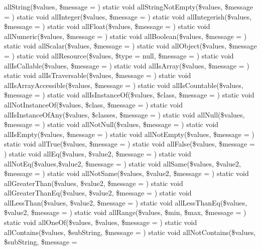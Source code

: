 all\+String(\$values, \$message = \textquotesingle{}\textquotesingle{})  static void all\+String\+Not\+Empty(\$values, \$message = \textquotesingle{}\textquotesingle{})  static void all\+Integer(\$values, \$message = \textquotesingle{}\textquotesingle{})  static void all\+Integerish(\$values, \$message = \textquotesingle{}\textquotesingle{})  static void all\+Float(\$values, \$message = \textquotesingle{}\textquotesingle{})  static void all\+Numeric(\$values, \$message = \textquotesingle{}\textquotesingle{})  static void all\+Boolean(\$values, \$message = \textquotesingle{}\textquotesingle{})  static void all\+Scalar(\$values, \$message = \textquotesingle{}\textquotesingle{})  static void all\+Object(\$values, \$message = \textquotesingle{}\textquotesingle{})  static void all\+Resource(\$values, \$type = null, \$message = \textquotesingle{}\textquotesingle{})  static void all\+Is\+Callable(\$values, \$message = \textquotesingle{}\textquotesingle{})  static void all\+Is\+Array(\$values, \$message = \textquotesingle{}\textquotesingle{})  static void all\+Is\+Traversable(\$values, \$message = \textquotesingle{}\textquotesingle{})  static void all\+Is\+Array\+Accessible(\$values, \$message = \textquotesingle{}\textquotesingle{})  static void all\+Is\+Countable(\$values, \$message = \textquotesingle{}\textquotesingle{})  static void all\+Is\+Instance\+Of(\$values, \$class, \$message = \textquotesingle{}\textquotesingle{})  static void all\+Not\+Instance\+Of(\$values, \$class, \$message = \textquotesingle{}\textquotesingle{})  static void all\+Is\+Instance\+Of\+Any(\$values, \$classes, \$message = \textquotesingle{}\textquotesingle{})  static void all\+Null(\$values, \$message = \textquotesingle{}\textquotesingle{})  static void all\+Not\+Null(\$values, \$message = \textquotesingle{}\textquotesingle{})  static void all\+Is\+Empty(\$values, \$message = \textquotesingle{}\textquotesingle{})  static void all\+Not\+Empty(\$values, \$message = \textquotesingle{}\textquotesingle{})  static void all\+True(\$values, \$message = \textquotesingle{}\textquotesingle{})  static void all\+False(\$values, \$message = \textquotesingle{}\textquotesingle{})  static void all\+Eq(\$values, \$value2, \$message = \textquotesingle{}\textquotesingle{})  static void all\+Not\+Eq(\$values,\$value2, \$message = \textquotesingle{}\textquotesingle{})  static void all\+Same(\$values, \$value2, \$message = \textquotesingle{}\textquotesingle{})  static void all\+Not\+Same(\$values, \$value2, \$message = \textquotesingle{}\textquotesingle{})  static void all\+Greater\+Than(\$values, \$value2, \$message = \textquotesingle{}\textquotesingle{})  static void all\+Greater\+Than\+Eq(\$values, \$value2, \$message = \textquotesingle{}\textquotesingle{})  static void all\+Less\+Than(\$values, \$value2, \$message = \textquotesingle{}\textquotesingle{})  static void all\+Less\+Than\+Eq(\$values, \$value2, \$message = \textquotesingle{}\textquotesingle{})  static void all\+Range(\$values, \$min, \$max, \$message = \textquotesingle{}\textquotesingle{})  static void all\+One\+Of(\$values, \$values, \$message = \textquotesingle{}\textquotesingle{})  static void all\+Contains(\$values, \$sub\+String, \$message = \textquotesingle{}\textquotesingle{})  static void all\+Not\+Contains(\$values, \$sub\+String, \$message = 